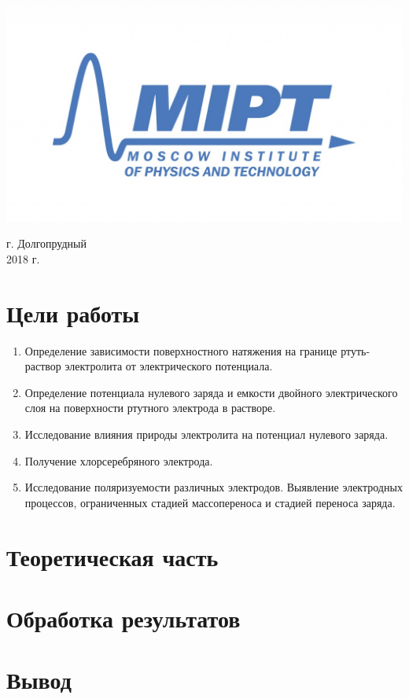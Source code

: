 \documentclass[a4paper, 12pt]{article}
\newenvironment{bottompar}{\par\vspace*{\fill}}{\clearpage}
\begin{document}
\begin{titlepage}
\begin{bottompar}
	\begin{center}
		\includegraphics[width = 80 mm]{logo.jpg}
	\end{center}
	{\large г. Долгопрудный\\2018 г.}

\end{bottompar}
\vfill %

\end{titlepage}

\setcounter{page}{2}

\newpage
\section{Цели работы}
	\begin{enumerate}
	
		\item 
		Определение зависимости поверхностного натяжения на границе ртуть-раствор
электролита от электрического потенциала.
		\item 
		 Определение потенциала нулевого заряда и емкости двойного электрического
слоя на поверхности ртутного электрода в растворе.
		\item 
		 Исследование влияния природы электролита на потенциал нулевого заряда.
		\item 
		 Получение хлорсеребряного электрода.
		\item 
		 Исследование поляризуемости различных электродов. Выявление электродных
процессов, ограниченных стадией массопереноса и стадией переноса заряда.
			
	\end{enumerate}
	
\section{Теоретическая часть}


\newpage
\section{Обработка результатов}


\begin{figure}[h]
	\centering
	\caption{}
\end{figure}
\newpage

\begin{figure}[t]
	\centering
	\caption{}
\end{figure}

\begin{figure}[h!]
	\centering
	\caption{}
\end{figure}

\newpage
\section{Вывод}
\end{document}
